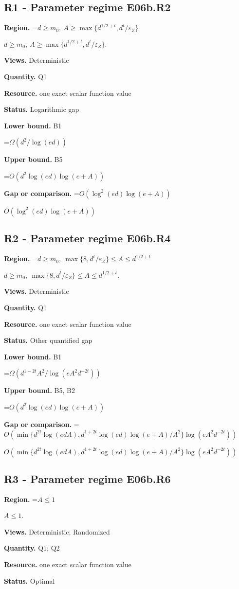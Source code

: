 \documentclass[10pt,a4paper]{article}
\newcommand{\AtlasMath}[1]{\par\begingroup\centering\setbox0=\hbox{$\displaystyle #1$}\ifdim\wd0>1.4\linewidth\typeout{ATLAS WIDE FORMULA: \the\wd0}\fi\ifdim\wd0>\linewidth\resizebox{\linewidth}{!}{\box0}\else\box0\fi\par\endgroup}
\newcommand{\AtlasInlineMath}[1]{\begingroup\setbox0=\hbox{$#1$}\ifdim\wd0>.4\linewidth\endgroup\AtlasMath{#1}\else\endgroup$#1$\fi}
\begin{document}
\subsection{R1 - Parameter regime E06b.R2}
\textbf{Region.} \AtlasInlineMath{d\ge m_0,\ A\ge\max\{d^{1/2+t},d^t/\varepsilon_Z\}}.

\textbf{Views.} Deterministic

\textbf{Quantity.} Q1

\textbf{Resource.} one exact scalar function value

\textbf{Status.} Logarithmic gap

\textbf{Lower bound.} B1

\AtlasMath{\Omega(d^2/\log(ed))}
\textbf{Upper bound.} B5

\AtlasMath{O(d^2\log(ed)\log(e+A))}
\textbf{Gap or comparison.} \AtlasInlineMath{O(\log^2(ed)\log(e+A))}

\subsection{R2 - Parameter regime E06b.R4}
\textbf{Region.} \AtlasInlineMath{d\ge m_0,\ \max\{8,d^t/\varepsilon_Z\}\le A\le d^{1/2+t}}.

\textbf{Views.} Deterministic

\textbf{Quantity.} Q1

\textbf{Resource.} one exact scalar function value

\textbf{Status.} Other quantified gap

\textbf{Lower bound.} B1

\AtlasMath{\Omega(d^{1-2t}A^2/\log(eA^2d^{-2t}))}
\textbf{Upper bound.} B5, B2

\AtlasMath{O(d^2\log(ed)\log(e+A))}
\textbf{Gap or comparison.} \AtlasInlineMath{O(\min\{d^{2t}\log(edA),d^{1+2t}\log(ed)\log(e+A)/A^2\}\log(eA^2d^{-2t}))}

\subsection{R3 - Parameter regime E06b.R6}
\textbf{Region.} \AtlasInlineMath{A\le1}.

\textbf{Views.} Deterministic; Randomized

\textbf{Quantity.} Q1; Q2

\textbf{Resource.} one exact scalar function value

\textbf{Status.} Optimal
\end{document}
